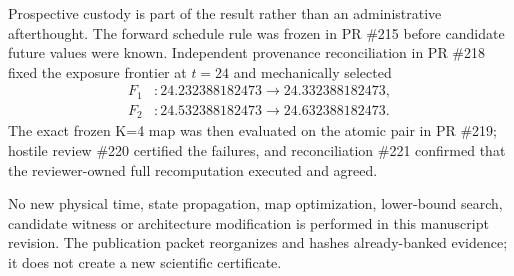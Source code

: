 Prospective custody is part of the result rather than an administrative afterthought.  The forward schedule rule was frozen in PR \#215 before candidate future values were known.  Independent provenance reconciliation in PR \#218 fixed the exposure frontier at $t=24$ and mechanically selected
\begin{align*}
F_1 &: 24.232388182473\to24.332388182473,\\
F_2 &: 24.532388182473\to24.632388182473.
\end{align*}
The exact frozen K=4 map was then evaluated on the atomic pair in PR \#219; hostile review \#220 certified the failures, and reconciliation \#221 confirmed that the reviewer-owned full recomputation executed and agreed.

No new physical time, state propagation, map optimization, lower-bound search, candidate witness or architecture modification is performed in this manuscript revision.  The publication packet reorganizes and hashes already-banked evidence; it does not create a new scientific certificate.
